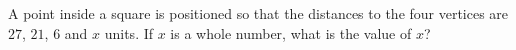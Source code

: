 A point inside a square is positioned so that the distances to the four vertices are $27$, $21$, $6$ and $x$ units. If $x$ is a whole number, what is the value of $x$?
